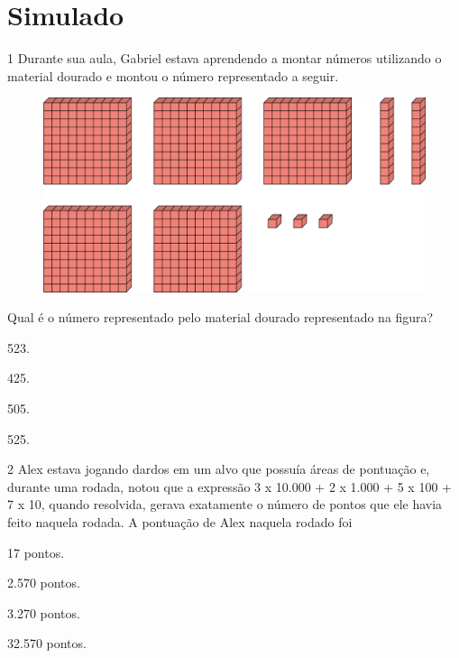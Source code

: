 \setcounter{chapter}{0}
\chapter[Simulado 1]{Simulado}

\num{1} Durante sua aula, Gabriel estava aprendendo a montar números utilizando o
material dourado e montou o número representado a seguir.

\begin{figure}[htpb!]
\centering
\includegraphics[width=\textwidth]{media/image76.png}
\end{figure}


Qual é o número representado pelo material dourado representado na figura?

\begin{multicols}{2}
\begin{escolha}
\item
  523.
\item
  425.
\item
  505.
\item
  525.
\end{escolha}
\end{multicols}


\num{2} Alex estava jogando dardos em um alvo que possuía áreas de pontuação e,
durante uma rodada, notou que a expressão 3 x 10.000 + 2 x 1.000 + 5 x
100 + 7 x 10, quando resolvida, gerava exatamente o número de pontos que
ele havia feito naquela rodada. A pontuação de Alex naquela rodado foi

\begin{escolha}
\item
  17 pontos.
\item
  2.570 pontos.
\item
  3.270 pontos.
\item
  32.570 pontos.
\end{escolha}

